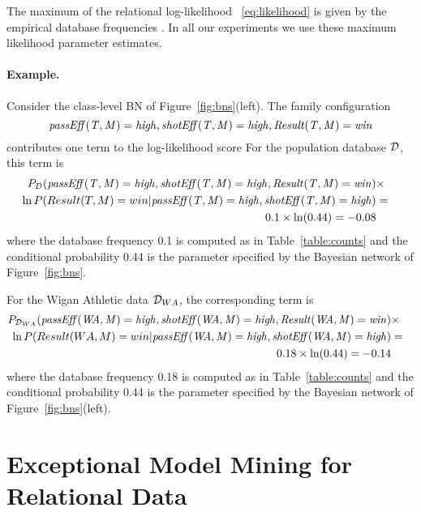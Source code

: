 {	The maximum of the relational log-likelihood ~\eqref{eq:likelihood} is given by the empirical database frequencies \cite[Prop.3.1.]{Schulte2011}. In all our experiments we use these maximum likelihood parameter estimates.
	
\paragraph{Example.} Consider the class-level BN of Figure~\ref{fig:bns}(left). The family configuration \begin{displaymath} \it{passEff(T,M)=high}, shotEff(T,M)=high, Result(T,M)=win\end{displaymath} contributes one term to the log-likelihood score For the population database $\mathcal{D}$, this term is 
\begin{eqnarray*}
P_{D}(\it{passEff(T,M)=high}, shotEff(T,M)=high, Result(T,M)=win) &\times&\\ \ln P(Result(T,M)=win|\it{passEff(T,M)=high}, shotEff(T,M)=high)  &=&\\ 0.1 \times \ln(0.44) =-0.08 & &
\end{eqnarray*}
where the database frequency 0.1 is computed as in Table~\ref{table:counts} and the conditional probability 0.44 is the parameter specified by the Bayesian network of Figure~\ref{fig:bns}. 
	
		
	For the  Wigan Athletic data $\mathcal{D}_{WA}$, the corresponding term is 
	\begin{eqnarray*}
P_{\mathcal{D}_{WA}}(\it{passEff(WA,M)=high}, shotEff(WA,M)=high, Result(WA,M)=win) &\times&\\ \ln P(Result(WA,M)=win|\it{passEff(WA,M)=high}, shotEff(WA,M)=high)  &=&\\ 0.18 \times \ln(0.44) =-0.14 & &
\end{eqnarray*}
where the database frequency 0.18 is computed as in Table~\ref{table:counts} and the conditional probability 0.44 is the parameter specified by the Bayesian network of Figure~\ref{fig:bns}(left). 


\section{Exceptional Model Mining for Relational Data} \label{sec:eld}

}
